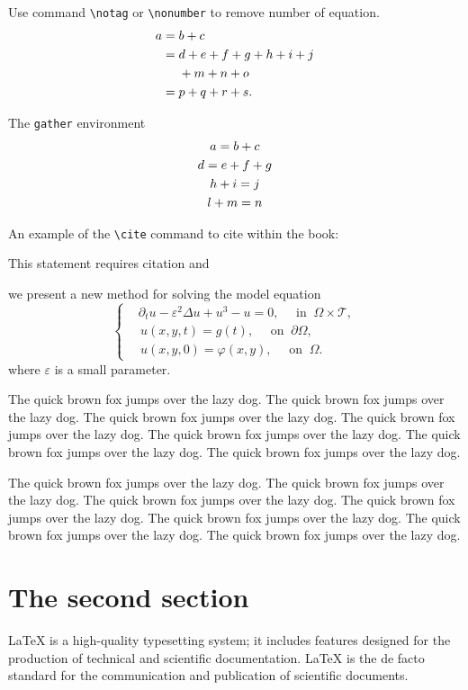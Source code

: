 \documentclass[openany,twoside,12pt]{book}
\theoremstyle{plain}
\numberwithin{equation}{chapter}
\numberwithin{figure}{chapter}
\numberwithin{table}{chapter}
\begin{document}
Use command \verb|\notag| or \verb|\nonumber| to remove number of equation.
\begin{align}
a ={} & b + c \\
={} & d + e + f + g + h + i + j \notag \\
& + m + n + o \\
={} & p + q + r + s.
\end{align}

The \texttt{gather} environment
\begin{gather}
a = b + c \\
d = e + f + g \notag \\
h + i = j \\
l + m = n
\end{gather}

An example of the \verb|\cite| command to cite within the book:

This statement requires citation \cite{Adams2003} and \cite{Shen1994,Tadmor2012,TreWei2014}


we present a new method for solving the model equation
\begin{equation}\label{eq:mulequ}
\left\{\begin{aligned}
  & \partial_{t} u-\varepsilon^{2} \Delta u+u^{3}-u=0, \quad \text{ in } ~\Omega\times\mathcal{T}, \\
  &\, u(x,y,t) = g(t), \quad \text{ on } ~ \partial \Omega, \\
  &\, u(x,y,0)=\varphi(x, y), \quad \text{ on } ~\Omega.
\end{aligned}\right.
\end{equation}
where $\varepsilon$ is a small parameter.

The quick brown fox jumps over the lazy dog. The quick brown fox jumps over the lazy dog. The quick brown fox jumps over the lazy dog. The quick brown fox jumps over the lazy dog. The quick brown fox jumps over the lazy dog. The quick brown fox jumps over the lazy dog. The quick brown fox jumps over the lazy dog.

The quick brown fox jumps over the lazy dog. The quick brown fox jumps over the lazy dog. The quick brown fox jumps over the lazy dog. The quick brown fox jumps over the lazy dog. The quick brown fox jumps over the lazy dog. The quick brown fox jumps over the lazy dog. The quick brown fox jumps over the lazy dog.


\section{The second section}
LaTeX is a high-quality typesetting system; it includes features designed for the production of technical and scientific documentation. LaTeX is the de facto standard for the communication and publication of scientific documents.
\end{document}
